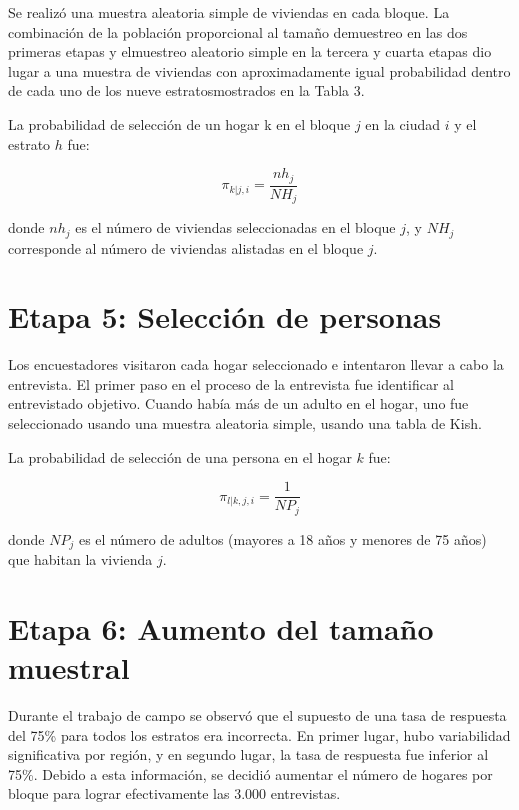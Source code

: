 \documentclass[
]{book}
\begin{document}
Se realizó una muestra aleatoria simple de viviendas en cada bloque. La combinación de la población proporcional al tamaño demuestreo en las dos primeras etapas y elmuestreo aleatorio simple en la tercera y cuarta etapas dio lugar a una muestra de viviendas con aproximadamente igual probabilidad dentro de cada uno de los nueve estratosmostrados en la Tabla 3.

La probabilidad de selección de un hogar k en el bloque \(j\) en la ciudad \(i\) y el estrato \(h\) fue:

\[\pi_{k|j,i}=\frac{nh_j}{NH_j}\]

donde \(nh_j\) es el número de viviendas seleccionadas en el bloque \(j\), y \(NH_j\) corresponde al número de viviendas alistadas en el bloque \(j\).

\hypertarget{etapa-5-selecciuxf3n-de-personas}{%
\section{Etapa 5: Selección de personas}\label{etapa-5-selecciuxf3n-de-personas}}

Los encuestadores visitaron cada hogar seleccionado e intentaron llevar a cabo la entrevista. El primer paso en el proceso de la entrevista fue identificar al entrevistado objetivo. Cuando había más de un adulto en el hogar, uno fue seleccionado usando una muestra aleatoria simple, usando una tabla de Kish.

La probabilidad de selección de una persona en el hogar \(k\) fue:

\[\pi_{l|k,j,i}=\frac{1}{NP_j}\]

donde \(NP_j\) es el número de adultos (mayores a 18 años y menores de 75 años) que habitan la vivienda \(j\).

\hypertarget{etapa-6-aumento-del-tamauxf1o-muestral}{%
\section{Etapa 6: Aumento del tamaño muestral}\label{etapa-6-aumento-del-tamauxf1o-muestral}}

Durante el trabajo de campo se observó que el supuesto de una tasa de respuesta del 75\% para todos los estratos era incorrecta. En primer lugar, hubo variabilidad significativa por región, y en segundo lugar, la tasa de respuesta fue inferior al 75\%. Debido a esta información, se decidió aumentar el número de hogares por bloque para lograr efectivamente las 3.000 entrevistas.
\end{document}
